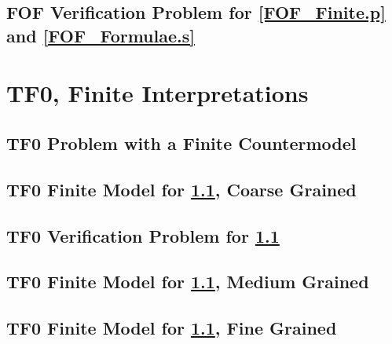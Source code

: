 \documentclass{easychair}
\begin{document}
\newpage
\subsection{FOF Verification Problem for \ref{FOF_Finite.p} and \ref{FOF_Formulae.s}}
\label{FOF_Formulae.s.p}
\begin{small}

\end{small}

\newpage
\section{TF0, Finite Interpretations}
\label{TF0Finite}

\subsection{TF0 Problem with a Finite Countermodel}
\label{TFF_Finite.p}
\begin{small}

\end{small}

\newpage
\subsection{TF0 Finite Model for \ref{TFF_Finite.p}, Coarse Grained}
\label{TFF_Finite.s}
\begin{small}

\end{small}

\newpage
\subsection{TF0 Verification Problem for \ref{TFF_Finite.p}}
\label{TFF_Finite.s.p}
\begin{small}

\end{small}

\newpage
\subsection{TF0 Finite Model for \ref{TFF_Finite.p}, Medium Grained}
\label{TFF_Finite_Medium.s}
\begin{small}

\end{small}

\newpage
\subsection{TF0 Finite Model for \ref{TFF_Finite.p}, Fine Grained}
\label{TFF_Finite_Fine.s}
\begin{small}

\end{small}
\end{document}
